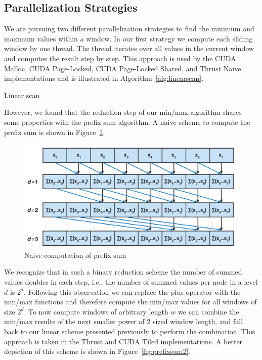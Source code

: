 \subsection{Parallelization Strategies}
\label{ch:parallelization}
We are pursuing two different parallelization strategies to find the minimum and maximum values within a window. In our first strategy we compute each sliding window by one thread. The thread iterates over all values in the current window and computes the result step by step. This approach is used by the CUDA Malloc, CUDA Page-Locked, CUDA Page-Locked Shared, and Thrust Naive implementations and is illustrated in Algorithm~\ref{alg:linearscan}.

\begin{algorithm}[h]
    \caption{Linear scan}
    \label{alg:linearscan}
\end{algorithm}

However, we found that the reduction step of our min/max algorithm shares some properties with the prefix sum algorithm. A naive scheme to compute the prefix sum is shown in  Figure~\ref{fig:prefixsum}.

\begin{figure}[h]
    \centering
    \includegraphics[width=0.6\linewidth]{Figures/prefix}
    \caption{Naive computation of prefix sum~\cite{Nguyen:2007:GG:1407436}}
    \label{fig:prefixsum}
\end{figure}

We recognize that in such a binary reduction scheme the number of summed values doubles in each step, i.e., the number of summed values per node in a level $d$ is $2^d$. Following this observation we can replace the plus operator with the min/max functions and therefore compute the min/max values for all windows of size $2^d$. To now compute windows of arbitrary length $w$ we can combine the min/max results of the next smaller power of 2 sized window length, and fall back to our linear scheme presented previously to perform the combination. This approach is taken in the Thrust and CUDA Tiled implementations. A better depiction of this scheme is shown in Figure~\ref{fig:prefixsum2}.

